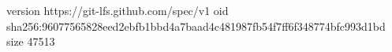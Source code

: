 version https://git-lfs.github.com/spec/v1
oid sha256:96077565828eed2ebfb1bbd4a7baad4c481987fb54f7ff6f348774bfc993d1bd
size 47513
